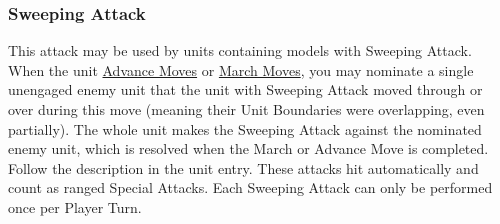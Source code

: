 \subsubsection{Sweeping Attack}
\idx[main=y]{\sweepingattack}\label{sweeping_attack}

This attack may be used by units containing models with Sweeping Attack. When the unit \hyperref[advance_move]{Advance Moves} or \hyperref[march_move]{March Moves}, you may nominate a single unengaged enemy unit that the unit with Sweeping Attack moved through or over during this move (meaning their Unit Boundaries were overlapping, even partially). The whole unit makes the Sweeping Attack against the nominated enemy unit, which is resolved when the March or Advance Move is completed. Follow the description in the unit entry. These attacks hit automatically and count as ranged Special Attacks. Each Sweeping Attack can only be performed once per Player Turn.

